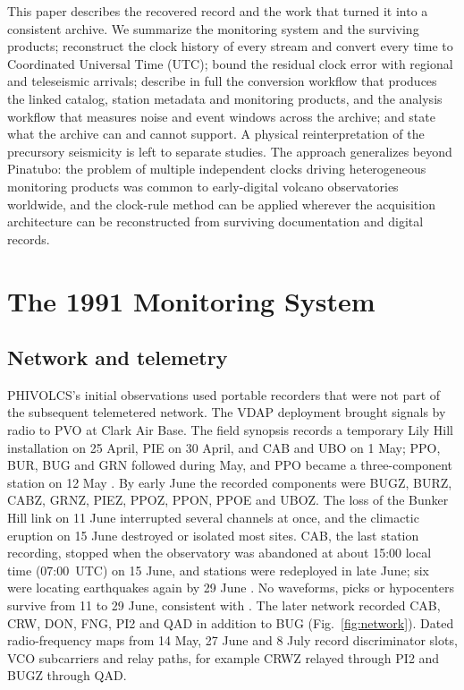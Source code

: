 \documentclass[linenum]{SSA-SRL}
\begin{document}
This paper describes the recovered record and the work that turned it into a consistent archive. We summarize the monitoring system and the surviving products; reconstruct the clock history of every stream and convert every time to Coordinated Universal Time (UTC); bound the residual clock error with regional and teleseismic arrivals; describe in full the conversion workflow that produces the linked catalog, station metadata and monitoring products, and the analysis workflow that measures noise and event windows across the archive; and state what the archive can and cannot support. A physical reinterpretation of the precursory seismicity is left to separate studies. The approach generalizes beyond Pinatubo: the problem of multiple independent clocks driving heterogeneous monitoring products was common to early-digital volcano observatories worldwide, and the clock-rule method can be applied wherever the acquisition architecture can be reconstructed from surviving documentation and digital records.

\section{The 1991 Monitoring System}

\subsection{Network and telemetry}

PHIVOLCS's initial observations used portable recorders that were not part of the subsequent telemetered network. The VDAP deployment brought signals by radio to PVO at Clark Air Base. The field synopsis records a temporary Lily Hill installation on 25 April, PIE on 30 April, and CAB and UBO on 1 May; PPO, BUR, BUG and GRN followed during May, and PPO became a three-component station on 12 May \citep{Lockhart_1996}. By early June the recorded components were BUGZ, BURZ, CABZ, GRNZ, PIEZ, PPOZ, PPON, PPOE and UBOZ. The loss of the Bunker Hill link on 11 June interrupted several channels at once, and the climactic eruption on 15 June destroyed or isolated most sites. CAB, the last station recording, stopped when the observatory was abandoned at about 15:00 local time (07:00~UTC) on 15 June, and stations were redeployed in late June; six were locating earthquakes again by 29 June \citep{Mori_1996a}. No waveforms, picks or hypocenters survive from 11 to 29 June, consistent with \citet{Hoblitt_1996}. The later network recorded CAB, CRW, DON, FNG, PI2 and QAD in addition to BUG (Fig.~\ref{fig:network}). Dated radio-frequency maps from 14 May, 27 June and 8 July record discriminator slots, VCO subcarriers and relay paths, for example CRWZ relayed through PI2 and BUGZ through QAD.
\end{document}
